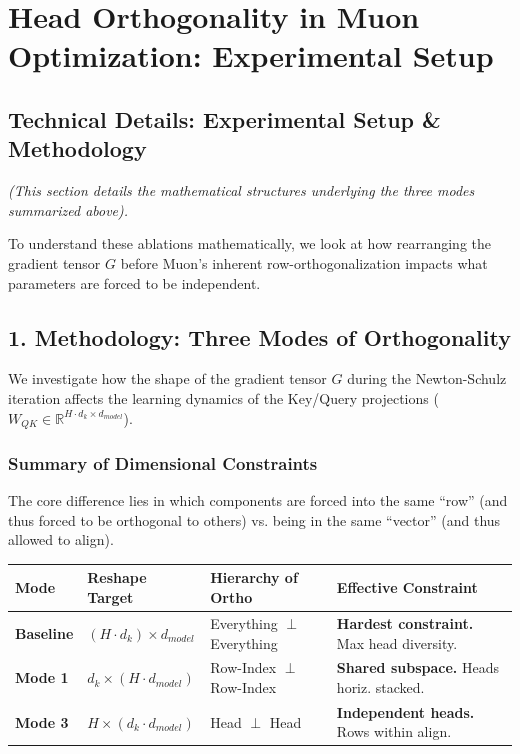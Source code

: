 \documentclass[12pt]{article}
\begin{document}
\vspace{1em}

\section*{Head Orthogonality in Muon Optimization: Experimental Setup}

\subsection*{Technical Details: Experimental Setup \& Methodology}

\textit{(This section details the mathematical structures underlying the three modes summarized above).}

To understand these ablations mathematically, we look at how rearranging the gradient tensor $G$ before Muon's inherent row-orthogonalization impacts what parameters are forced to be independent.

\subsection*{1. Methodology: Three Modes of Orthogonality}

We investigate how the shape of the gradient tensor $G$ during the Newton-Schulz iteration affects the learning dynamics of the Key/Query projections ($W_{QK} \in \mathbb{R}^{H \cdot d_k \times d_{model}}$).

\subsubsection*{Summary of Dimensional Constraints}

The core difference lies in which components are forced into the same ``row'' (and thus forced to be orthogonal to others) vs. being in the same ``vector'' (and thus allowed to align).

\begin{table}[h]
\centering
\color{lighttext}
\begin{tabularx}{\textwidth}{l l l X}
\toprule
Mode & Reshape Target & Hierarchy of Ortho & Effective Constraint \\
\midrule
\textbf{Baseline} & $(H \cdot d_k) \times d_{model}$ & Everything $\perp$ Everything & \textbf{Hardest constraint.} Max head diversity. \\
\textbf{Mode 1} & $d_k \times (H \cdot d_{model})$ & Row-Index $\perp$ Row-Index & \textbf{Shared subspace.} Heads horiz. stacked. \\
\textbf{Mode 3} & $H \times (d_k \cdot d_{model})$ & Head $\perp$ Head & \textbf{Independent heads.} Rows within align. \\
\bottomrule
\end{tabularx}
\end{table}
\end{document}
